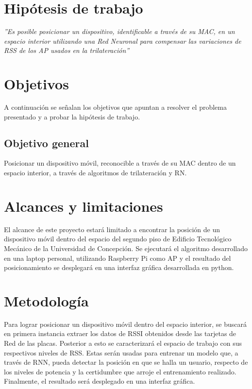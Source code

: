 \section{Hipótesis de trabajo}
\begin{center}
\textit{''Es posible posicionar un dispositivo, identificable a través de su MAC, en un espacio interior utilizando una Red Neuronal para compensar las variaciones de RSS de los \ac{AP} usados en la trilateración''}
\end{center}

\section{Objetivos}
A continuación se señalan los objetivos que apuntan a resolver el problema presentado y a probar la hipótesis de trabajo.

\subsection{Objetivo general}
Posicionar un dispositivo móvil, reconocible a través de su \ac{MAC} dentro de un espacio interior, a través de algoritmos de trilateración y \ac{RN}.


\section{Alcances y limitaciones}
El alcance de este proyecto estará limitado a encontrar la posición de un dispositivo móvil dentro del espacio del segundo piso de Edificio Tecnológico Mecánico de la Universidad de Concepción. Se ejecutará el algoritmo desarrollado en una laptop personal, utilizando Raspberry Pi como \ac{AP} y el resultado del posicionamiento se desplegará en una interfaz gráfica desarrollada en python.

\section{Metodología}

Para lograr posicionar un dispositivo móvil dentro del espacio interior, se buscará en primera instancia extraer los datos de RSSI obtenidos desde las tarjetas de Red de las placas. Posterior a esto se caracterizará el espacio de trabajo con sus respectivos niveles de RSS. Estas serán usadas para entrenar un modelo que, a través de RNN, pueda detectar la posición en que se halla un usuario, respecto de los niveles de potencia y la certidumbre que arroje el entrenamiento realizado. Finalmente, el resultado será desplegado en una interfaz gráfica.